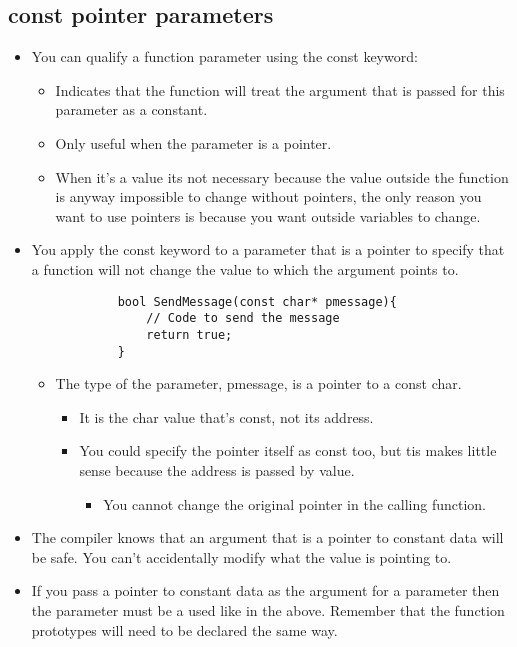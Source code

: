 \subsection{const pointer parameters}
\begin{itemize}
    \item You can qualify a function parameter using the const keyword:
        \begin{itemize}
            \item Indicates that the function will treat the argument that is passed for this parameter as a constant. 
            \item Only useful when the parameter is a pointer.
            \item When it's a value its not necessary because the value outside the function is anyway impossible to change without pointers, the only reason you want to use pointers is because you want outside variables to change. 
        \end{itemize}
    
    \item You apply the const keyword to a parameter that is a pointer to specify that a function will not change the value to which the argument points to. 
        \begin{verbatim}
            bool SendMessage(const char* pmessage){
                // Code to send the message 
                return true; 
            }
        \end{verbatim}
        \begin{itemize}
            \item The type of the parameter, pmessage, is a pointer to a const char.
                \begin{itemize}
                    \item It is the char value that's const, not its address. 
                    \item You could specify the pointer itself as const too, but tis makes little sense because the address is passed by value. 
                        \begin{itemize}
                            \item You cannot change the original pointer in the calling function. 
                        \end{itemize}
                \end{itemize}
        \end{itemize}

    \item The compiler knows that an argument that is a pointer to constant data will be safe. You can't accidentally modify what the value is pointing to. 
    \item If you pass a pointer to constant data as the argument for a parameter then the parameter must be a used like in the above. Remember that the function prototypes will need to be declared the same way. 
\end{itemize}

